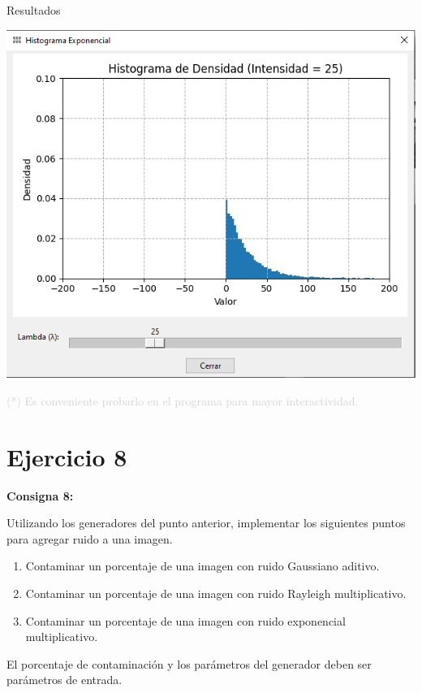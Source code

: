 \documentclass{beamer}
\begin{document}
\begin{frame}[fragile]{Resultados}
\begin{minipage}{0.32\linewidth}
	\end{minipage}\hfill
	\begin{minipage}{0.32\linewidth}
		\centering
		\includegraphics[width=\linewidth]{../results/dist_exponencial}
	\end{minipage}
	
	\vfill
\footnotesize \textcolor{lightgray}{(*) Es conveniente probarlo en el programa para mayor interactividad.}
\end{frame}

\section{Ejercicio 8}

\begin{frame}
	\begin{center}
		\textcolor{unahurverde}{\textbf{Consigna 8:}}
	\end{center}
	\justifying
	
	Utilizando los generadores del punto anterior, implementar los siguientes puntos para agregar ruido a una imagen.
	
	\begin{enumerate}[label=\alph*)]
		\item Contaminar un porcentaje de una imagen con ruido Gaussiano aditivo.
		\item Contaminar un porcentaje de una imagen con ruido Rayleigh multiplicativo.
		\item Contaminar un porcentaje de una imagen con ruido exponencial multiplicativo.
	\end{enumerate}
	
	\vspace{0.3cm}
	
	El porcentaje de contaminación y los parámetros del generador deben ser parámetros de entrada.
\end{frame}
\end{document}
